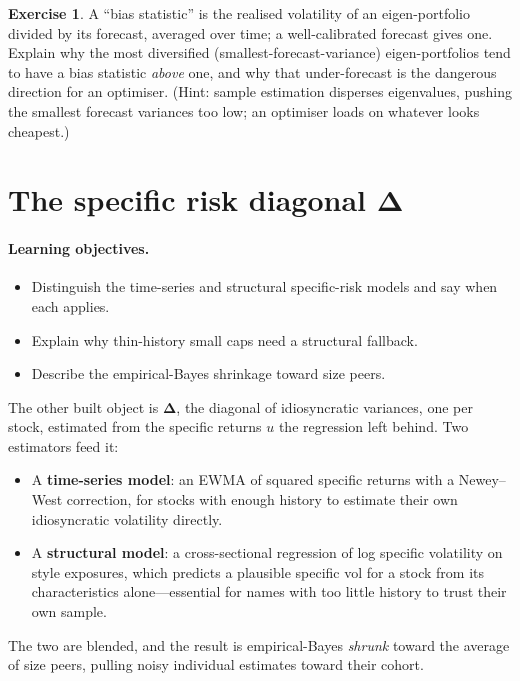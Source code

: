 \documentclass[11pt]{article}
\theoremstyle{definition}
\newtheorem{exercise}{Exercise}[section]
\theoremstyle{plain}
\theoremstyle{remark}
\newcommand{\Del}{\boldsymbol{\Delta}}
\begin{document}
\begin{exercise}
A ``bias statistic'' is the realised volatility of an eigen-portfolio divided by its forecast, averaged over time; a well-calibrated forecast gives one. Explain why the most diversified (smallest-forecast-variance) eigen-portfolios tend to have a bias statistic \emph{above} one, and why that under-forecast is the dangerous direction for an optimiser. (Hint: sample estimation disperses eigenvalues, pushing the smallest forecast variances too low; an optimiser loads on whatever looks cheapest.)
\end{exercise}

\section{The specific risk diagonal \texorpdfstring{$\Del$}{Delta}}\label{sec:specific}

\paragraph{Learning objectives.}
\begin{itemize}[leftmargin=1.4em,nosep]
  \item Distinguish the time-series and structural specific-risk models and say when each applies.
  \item Explain why thin-history small caps need a structural fallback.
  \item Describe the empirical-Bayes shrinkage toward size peers.
\end{itemize}

The other built object is $\Del$, the diagonal of idiosyncratic variances, one per stock, estimated from the specific returns $u$ the regression left behind. Two estimators feed it:
\begin{itemize}[leftmargin=1.4em,nosep]
  \item A \textbf{time-series model}: an EWMA of squared specific returns with a Newey--West correction, for stocks with enough history to estimate their own idiosyncratic volatility directly.
  \item A \textbf{structural model}: a cross-sectional regression of log specific volatility on style exposures, which predicts a plausible specific vol for a stock from its characteristics alone---essential for names with too little history to trust their own sample.
\end{itemize}
The two are blended, and the result is empirical-Bayes \emph{shrunk} toward the average of size peers, pulling noisy individual estimates toward their cohort.
\end{document}
